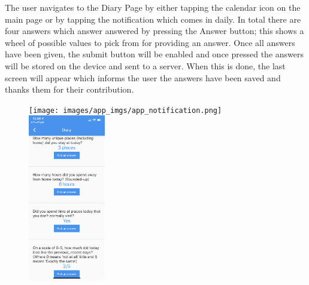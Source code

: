 The user navigates to the Diary Page by either tapping the calendar icon on the main page or by tapping the notification which comes in daily. In total there are four answers which answer answered by pressing the Answer button; this shows a wheel of possible values to pick from for providing an answer. Once all answers have been given, the submit button will be enabled and once pressed the answers will be stored on the device and sent to a server. When this is done, the last screen will appear which informs the user the answers have been saved and thanks them for their contribution.

\begin{figure}
    \centering
    \texttt{[image: images/app\_imgs/app\_notification.png]} \includegraphics[width=0.3\textwidth]{images/app_imgs/app_noanswers.png} \\

\end{figure}
